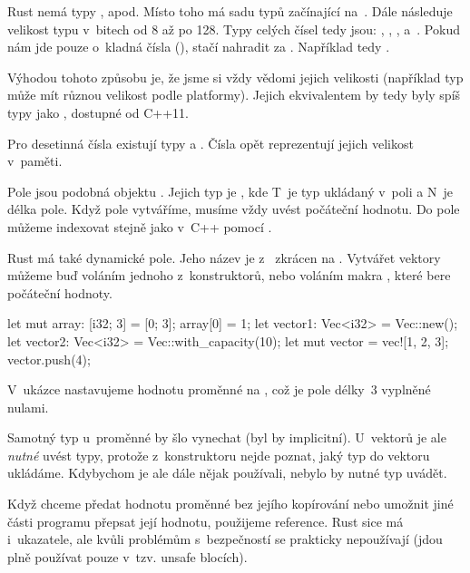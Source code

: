 \documentclass[main.tex]{subfiles}
\begin{document}

Rust nemá typy ,  apod. Místo toho má sadu typů začínající
na~. Dále následuje velikost typu v~bitech od 8 až po 128. Typy celých čísel tedy
jsou: , , ,  a~. Pokud nám jde
pouze o~kladná čísla (), stačí nahradit  za . Například
tedy .

Výhodou tohoto způsobu je, že jsme si vždy vědomi jejich velikosti (například typ
 může mít různou velikost podle platformy). Jejich ekvivalentem by tedy byly
spíš typy jako , dostupné od C++11.

Pro desetinná čísla existují typy  a . Čísla opět reprezentují
jejich velikost v~paměti.


Pole jsou podobná objektu . Jejich typ je \irust{[T; N]}, kde T~je typ
ukládaný v~poli a N~je délka pole. Když pole vytváříme, musíme vždy uvést počáteční
hodnotu. Do pole můžeme indexovat stejně jako v~C++ pomocí \icpp{[]}.

Rust má také dynamické pole. Jeho název je z~ zkrácen na .
Vytvářet vektory můžeme buď voláním jednoho z~konstruktorů, nebo voláním makra
, které bere počáteční hodnoty.

\obrazek
\begin{rustcode}
    let mut array: [i32; 3] = [0; 3];
    array[0] = 1;
    let vector1: Vec<i32> = Vec::new();
    let vector2: Vec<i32> = Vec::with_capacity(10);
    let mut vector = vec![1, 2, 3];
    vector.push(4);
\end{rustcode}

V~ukázce nastavujeme hodnotu proměnné  na \irust{[0; 3]}, což je pole délky~3
vyplněné nulami.

Samotný typ u~proměnné  by šlo vynechat (byl by implicitní). U~vektorů je ale
\emph{nutné} uvést typy, protože z~konstruktoru nejde poznat, jaký typ do vektoru
ukládáme. Kdybychom je ale dále nějak používali, nebylo by nutné typ uvádět.


Když chceme předat hodnotu proměnné bez jejího kopírování nebo umožnit jiné části programu
přepsat její hodnotu, použijeme reference. Rust sice má i~ukazatele, ale kvůli problémům
s~bezpečností se prakticky nepoužívají (jdou plně používat pouze v~tzv. unsafe blocích).
\end{document}
